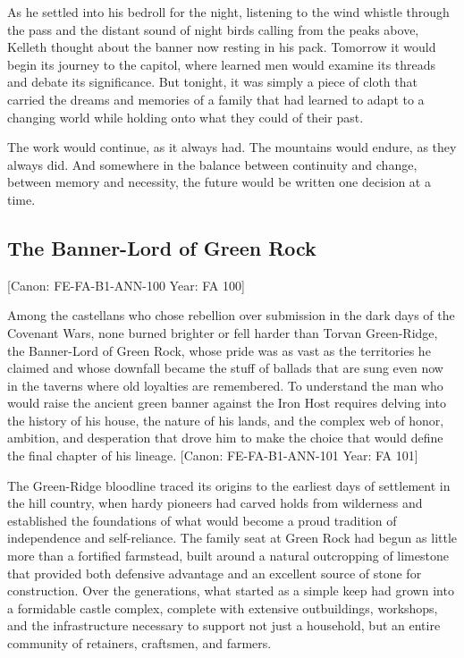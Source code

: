 As he settled into his bedroll for the night, listening to the wind
whistle through the pass and the distant sound of night birds calling
from the peaks above, Kelleth thought about the banner now resting in
his pack. Tomorrow it would begin its journey to the capitol, where
learned men would examine its threads and debate its significance. But
tonight, it was simply a piece of cloth that carried the dreams and
memories of a family that had learned to adapt to a changing world while
holding onto what they could of their past.

The work would continue, as it always had. The mountains would endure,
as they always did. And somewhere in the balance between continuity and
change, between memory and necessity, the future would be written one
decision at a time.

\subsection{The Banner-Lord of Green
Rock}\label{the-banner-lord-of-green-rock}

{[}Canon: FE-FA-B1-ANN-100 \textbar{} Year: FA 100{]}

Among the castellans who chose rebellion over submission in the dark
days of the Covenant Wars, none burned brighter or fell harder than
Torvan Green-Ridge, the Banner-Lord of Green Rock, whose pride was as
vast as the territories he claimed and whose downfall became the stuff
of ballads that are sung even now in the taverns where old loyalties are
remembered. To understand the man who would raise the ancient green
banner against the Iron Host requires delving into the history of his
house, the nature of his lands, and the complex web of honor, ambition,
and desperation that drove him to make the choice that would define the
final chapter of his lineage. {[}Canon: FE-FA-B1-ANN-101 \textbar{}
Year: FA 101{]}

The Green-Ridge bloodline traced its origins to the earliest days of
settlement in the hill country, when hardy pioneers had carved holds
from wilderness and established the foundations of what would become a
proud tradition of independence and self-reliance. The family seat at
Green Rock had begun as little more than a fortified farmstead, built
around a natural outcropping of limestone that provided both defensive
advantage and an excellent source of stone for construction. Over the
generations, what started as a simple keep had grown into a formidable
castle complex, complete with extensive outbuildings, workshops, and the
infrastructure necessary to support not just a household, but an entire
community of retainers, craftsmen, and farmers.

